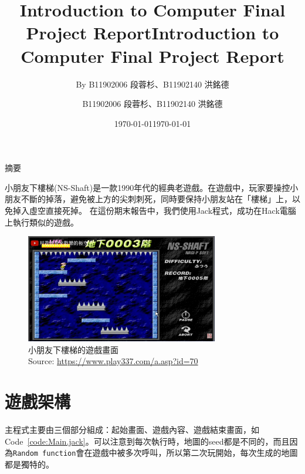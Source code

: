 \documentclass[12pt,a4paper]{article}
\title{Introduction to Computer Final Project Report}
\date{\today}
\author{By B11902006 段蓉杉、B11902140 洪銘德}
\begin{document}
\title{\textbf{Introduction to Computer Final Project Report}}
\author{B11902006 段蓉杉、B11902140 洪銘德}
\date{\today}
\maketitle

\centerline{\Large 摘要}
\vspace{0.5em}
小朋友下樓梯(NS-Shaft)是一款1990年代的經典老遊戲。在遊戲中，玩家要操控小朋友不斷的掉落，避免被上方的尖刺刺死，同時要保持小朋友站在「樓梯」上，以免掉入虛空直接死掉。
在這份期末報告中，我們使用Jack程式，成功在Hack電腦上執行類似的遊戲。

\begin{figure}[hbp]
\centering
\includegraphics[width=0.75\textwidth]{NS-Shaft.png}
\caption{\label{fig:NS-Shaft}小朋友下樓梯的遊戲畫面\\Source: \protect\url{https://www.play337.com/a.asp?id=70}}
\end{figure}



\newpage

\section{遊戲架構}

主程式主要由三個部分組成：起始畫面、遊戲內容、遊戲結束畫面，如Code~\ref{code:Main.jack}。可以注意到每次執行時，地圖的seed都是不同的，而且因為\texttt{Random function}會在遊戲中被多次呼叫，所以第二次玩開始，每次生成的地圖都是獨特的。

% 
\end{document}

